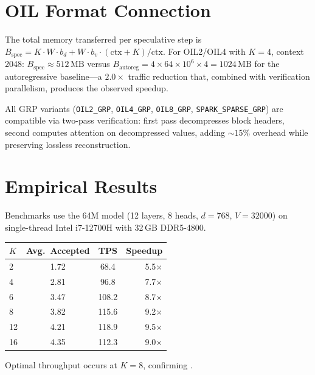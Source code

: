\section{OIL Format Connection}
\label{sec:format_speculative_connection}

The total memory transferred per speculative step is
$B_{\text{spec}} = K \cdot W \cdot b_d + W \cdot b_v \cdot
(\text{ctx}+K)/\text{ctx}$.
For OIL2/OIL4 with $K=4$, context 2048:
$B_{\text{spec}} \approx 512\,\text{MB}$ versus
$B_{\text{autoreg}} = 4 \times 64\times 10^6 \times 4 = 1024\,\text{MB}$
for the autoregressive baseline---a $2.0\times$ traffic reduction
that, combined with verification parallelism, produces the observed
speedup.

All GRP variants (\texttt{OIL2\_GRP}, \texttt{OIL4\_GRP},
\texttt{OIL8\_GRP}, \texttt{SPARK\_SPARSE\_GRP}) are compatible via
two-pass verification: first pass decompresses block headers, second
computes attention on decompressed values, adding $\sim 15\%$ overhead
while preserving lossless reconstruction.

\section{Empirical Results}
\label{sec:empirical_speedup}

Benchmarks use the 64M model (12 layers, 8 heads, $d=768$, $V=32000$)
on single-thread Intel i7-12700H with 32\,GB DDR5-4800.

\begin{center}
\begin{tabular}{lccr}
\toprule
$K$ & \textbf{Avg.\ Accepted} & \textbf{TPS} & \textbf{Speedup} \\
\midrule
2  & 1.72 & 68.4  & 5.5$\times$ \\
4  & 2.81 & 96.8  & 7.7$\times$ \\
6  & 3.47 & 108.2 & 8.7$\times$ \\
8  & 3.82 & 115.6 & 9.2$\times$ \\
12 & 4.21 & 118.9 & 9.5$\times$ \\
16 & 4.35 & 112.3 & 9.0$\times$ \\
\bottomrule
\end{tabular}
\end{center}

 \label{tab:spec_speedup_K}

Optimal throughput occurs at $K=8$, confirming .

